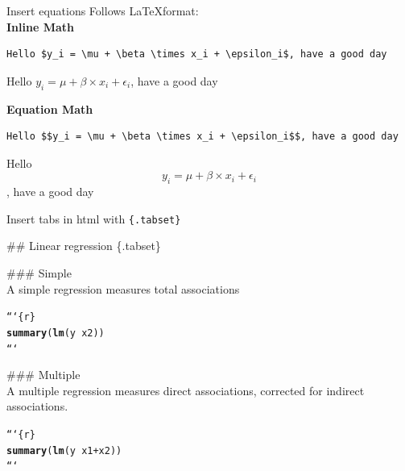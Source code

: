 \documentclass[10pt]{beamer}\usepackage[]{graphicx}\usepackage[]{color}
\makeatletter
\newcommand{\hlkwd}[1]{\textcolor[rgb]{0.737,0.353,0.396}{\textbf{#1}}}%
\newenvironment{kframe}{%
 \def\at@end@of@kframe{}%
 \ifinner\ifhmode%
  \def\at@end@of@kframe{\end{minipage}}%
  \begin{minipage}{\columnwidth}%
 \fi\fi%
 \def\FrameCommand##1{\hskip\@totalleftmargin \hskip-\fboxsep
 \colorbox{shadecolor}{##1}\hskip-\fboxsep
     \hskip-\linewidth \hskip-\@totalleftmargin \hskip\columnwidth}%
 \MakeFramed {\advance\hsize-\width
   \@totalleftmargin\z@ \linewidth\hsize
   \@setminipage}}%
 {\par\unskip\endMakeFramed%
 \at@end@of@kframe}
\newenvironment{knitrout}{}{} %
\makeatother
\begin{document}
\begin{frame}[fragile]{Insert equations}
Follows \LaTeX format:\\

\textbf{Inline Math}

\begin{verbatim}
Hello $y_i = \mu + \beta \times x_i + \epsilon_i$, have a good day
\end{verbatim}

Hello $y_i = \mu + \beta \times x_i + \epsilon_i$, have a good day

\pause

\textbf{Equation Math}

\begin{verbatim}
Hello $$y_i = \mu + \beta \times x_i + \epsilon_i$$, have a good day
\end{verbatim}

Hello $$y_i = \mu + \beta \times x_i + \epsilon_i$$, have a good day

\end{frame}

\begin{frame}[fragile]{Insert tabs in html with \texttt{\{.tabset\}}}

\#\# Linear regression \{.tabset\}

\#\#\# Simple\\
A simple regression measures total associations

\begin{knitrout}\small
{}\color{fgcolor}\begin{kframe}
\begin{alltt}
```\{r\}
\hlkwd{summary}(\hlkwd{lm}(y ~ x2))
```
\end{alltt}
\end{kframe}
\end{knitrout}

\#\#\# Multiple\\
A multiple regression measures direct associations, corrected for indirect associations.
\begin{knitrout}\small
{}\color{fgcolor}\begin{kframe}
\begin{alltt}
```\{r\}
\hlkwd{summary}(\hlkwd{lm}(y ~ x1+x2))
```
\end{alltt}
\end{kframe}
\end{knitrout}
\end{frame}
\end{document}
